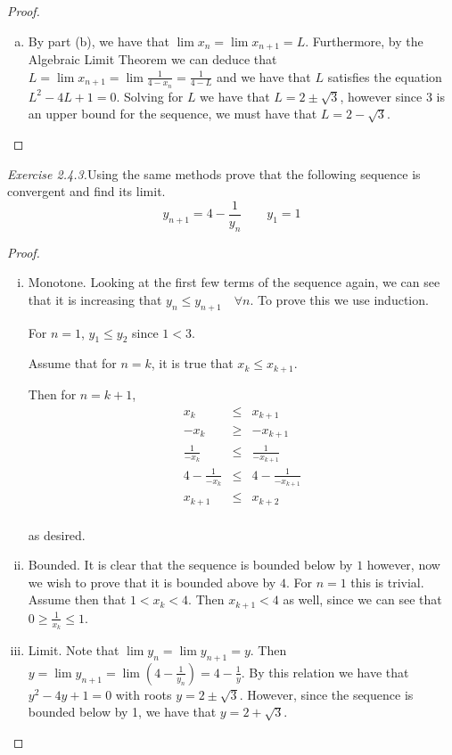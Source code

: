 \documentclass{tufte-book}
\theoremstyle{definition}
\numberwithin{section}{chapter}
\begin{document}
\begin{proof}
\begin{enumerate}[(a)]
							\item By part (b), we have that  $\lim x_n = \lim x_{n+1} = L$. Furthermore, by the Algebraic Limit Theorem we can deduce that $L = \lim x_{n+1} = \lim \frac{1}{4-x_n} = \frac{1}{4-L}$ and we have that $L$ satisfies the equation $L^2 - 4L +1 =0$.  Solving for $L$ we have that $L = 2 \pm \sqrt{3}$, however since $3$ is an upper bound for the sequence, we must have that $L= 2 - \sqrt{3}$.
			\end{enumerate}
		
		\end{proof}
		
\noindent		
\emph{Exercise 2.4.3.}Using the same methods prove that the following sequence is convergent and find its limit.
	$$y_{n+1} = 4 - \frac{1}{y_n}	\qquad y_1 = 1$$
	
	\begin{proof}
		\begin{enumerate}[(i)]
			\item Monotone.  Looking at the first few terms of the sequence again, we can see that it is increasing that $y_n \leq y_{n+1} \quad \forall n$.  To prove this we use induction.
				
				For $n=1$, $y_1 \leq y_2$ since $1 < 3$.
				
				Assume that for $n=k$, it is true that $x_{k} \leq x_{k+1}$.
				
				Then for $n = k+1$, 
				\begin{eqnarray*}
x_{k}  &\leq & x_{k+1} \\
   	-x_{k}  &\geq& -x_{k+1} \\
    \frac{1}{-x_{k}}  &\leq&\frac{1}{ -x_{k+1}}\\
      4- \frac{1}{-x_{k}}  &\leq&4- \frac{1}{ -x_{k+1}}\\
   x_{k+1}  &\leq& x_{k+2} \\
\end{eqnarray*}

as desired.

\item Bounded.  It is clear that the sequence is bounded below by $1$ however, now we wish to prove that it is bounded above by $4$.  For $n=1$ this is trivial.  Assume then that $1< x_k < 4$.  Then $x_{k+1}<4$ as well, since we can see that $0 \geq \frac{1}{x_k}\leq 1$.

\item Limit.  Note that $\lim y_n = \lim y_{n+1} = y$.  Then $y = \lim y_{n+1} =  \lim (4 - \frac{1}{y_n}) = 4 - \frac{1}{y}$.  By this relation we have that $y^2 - 4y + 1 =0$ with roots $y = 2 \pm \sqrt{3}$.  However, since the sequence is bounded below by 1, we have that $y = 2 + \sqrt{3}$.

				
		\end{enumerate}
	\end{proof}
	
\end{document}
